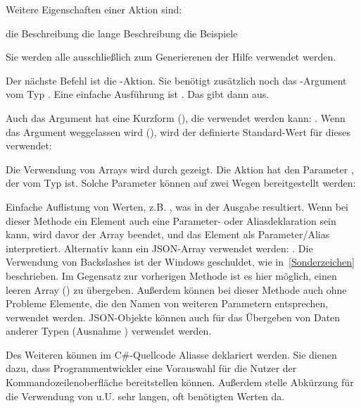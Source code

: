 Weitere Eigenschaften einer Aktion sind:
\begin{outline}
 \1 die Beschreibung
 \1 die lange Beschreibung
 \1 die Beispiele
\end{outline}
Sie werden alle ausschließlich zum Generierenen der Hilfe verwendet werden.

Der nächste Befehl ist die -Aktion.
Sie benötigt zusätzlich noch das -Argument vom Typ .
Eine einfache Ausführung ist .
Das gibt dann  aus.

Auch das Argument hat eine Kurzform (), die verwendet werden kann: .
Wenn das Argument weggelassen wird (), wird der definierte Standard-Wert für dieses verwendet:

Die Verwendung von Arrays wird durch  gezeigt.
Die Aktion hat den Parameter , der vom Typ  ist.
Solche Parameter können auf zwei Wegen bereitgestellt werden:
\begin{outline}
 \1 Einfache Auflistung von Werten, z.B. , was in der Ausgabe  resultiert.
 Wenn bei dieser Methode ein Element auch eine Parameter- oder Aliasdeklaration sein kann, wird davor der Array beendet, und das Element als Parameter/Alias interpretiert.
 \1 Alternativ kann ein JSON-Array verwendet werden: .
 Die Verwendung von Backslashes ist der Windows  geschuldet, wie in~\ref{Sonderzeichen} beschrieben.
 Im Gegensatz zur vorherigen Methode ist es hier möglich, einen leeren Array (\inlinecode{[]}) zu übergeben.
 Außerdem können bei dieser Methode auch ohne Probleme Elemente, die den Namen von weiteren Parametern entsprechen, verwendet werden.
 JSON-Objekte können auch für das \"Ubergeben von Daten anderer Typen (Ausnahme ) verwendet werden.
\end{outline} 

Des Weiteren können im C\#-Quellcode Aliasse deklariert werden.
Sie dienen dazu, dass Programmentwickler eine Vorauswahl für die Nutzer der Kommandozeilenoberfläche bereitstellen können.
Außerdem stelle Abkürzung für die Verwendung von u.U. sehr langen, oft benötigten Werten da.

